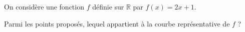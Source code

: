 
On considère une fonction $f$ définie sur $\mathbb{R}$ par $f(x)=2x+1$.

Parmi les points proposés, lequel appartient à la courbe représentative de $f$ ?

\smallskip
{}

